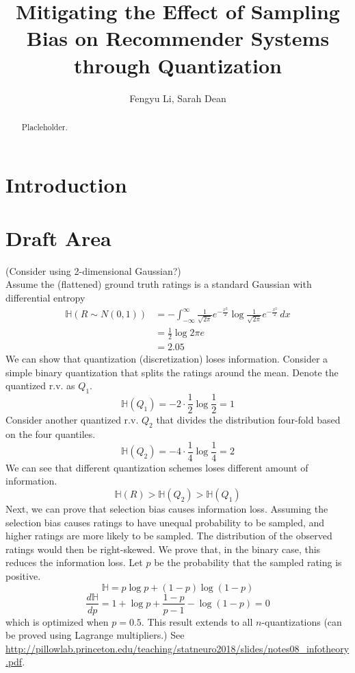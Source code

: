 \documentclass[12pt, letterpaper]{article}
\title{\vspace{-2.0cm}Mitigating the Effect of Sampling Bias on Recommender Systems through Quantization}
\author{Fengyu Li, Sarah Dean}
\date{}
\theoremstyle{definition}\newtheorem*{definition}{Definition}
\theoremstyle{definition}\newtheorem*{example}{Example}
\theoremstyle{definition}\newtheorem*{remark}{Remark}
\def\HH{\mathbb{H}}
\begin{document}
\maketitle

\begin{abstract}
    Placleholder.
\end{abstract}

\section{Introduction}

\section{Draft Area}
 (Consider using 2-dimensional Gaussian?)\\
Assume the (flattened) ground truth ratings is a standard Gaussian with differential entropy
\begin{align*} \HH(R\sim N(0, 1)) & = -\int_{-\infty}^\infty \frac{1}{\sqrt{2\pi}}e^{-\frac{x^2}{2}} \log \frac{1}{\sqrt{2\pi}}e^{-\frac{x^2}{2}} \, dx \\
                                  & = \frac{1}{2}\log 2\pi e                                                                                            \\
                                  & = 2.05
\end{align*}
We can show that quantization (discretization) loses information. Consider
a simple binary quantization that splits the ratings around the mean. Denote the quantized r.v. as $Q_1$.
\[ \HH(Q_1) = -2 \cdot \frac{1}{2} \log \frac{1}{2} = 1 \]
Consider another quantized r.v. $Q_2$ that divides the distribution four-fold based on the four quantiles.
\[ \HH(Q_2) = -4 \cdot \frac{1}{4} \log \frac{1}{4} = 2 \]
We can see that different quantization schemes loses different amount of information.
\[ \HH(R) > \HH(Q_2) > \HH(Q_1) \]
Next, we can prove that selection bias causes information loss. Assuming the selection bias causes ratings to have unequal probability to be sampled, and higher ratings are more likely to be sampled. The distribution of the observed ratings would then be right-skewed. We prove that, in the binary case, this reduces the information loss. Let $p$ be the probability that the sampled rating is positive.
\[\HH = p\log p + (1-p) \log (1-p) \]
\[ \frac{d\HH}{dp} = 1 + \log p + \frac{1-p}{p-1} - \log(1-p) = 0 \]
which is optimized when $p = 0.5$. This result extends to all $n$-quantizations (can be proved using Lagrange multipliers.) See \url{http://pillowlab.princeton.edu/teaching/statneuro2018/slides/notes08_infotheory.pdf}.
\end{document}
